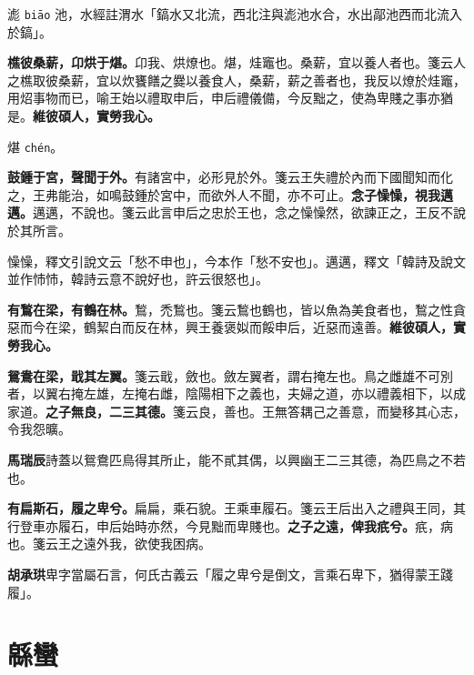 \begin{quoting}滮 \texttt{biāo} 池，水經註渭水「鎬水又北流，西北注與滮池水合，水出鄗池西而北流入於鎬」。\end{quoting}

\textbf{樵彼桑薪，卬烘于煁。}{\footnotesize 卬我、烘燎也。煁，烓竈也。桑薪，宜以養人者也。箋云人之樵取彼桑薪，宜以炊饔饍之爨以養食人，桑薪，薪之善者也，我反以燎於烓竈，用炤事物而已，喻王始以禮取申后，申后禮儀備，今反黜之，使為卑賤之事亦猶是。}\textbf{維彼碩人，實勞我心。}

\begin{quoting}煁 \texttt{chén}。\end{quoting}

\textbf{鼓鍾于宮，聲聞于外。}{\footnotesize 有諸宮中，必形見於外。箋云王失禮於內而下國聞知而化之，王弗能治，如鳴鼓鍾於宮中，而欲外人不聞，亦不可止。}\textbf{念子懆懆，視我邁邁。}{\footnotesize 邁邁，不說也。箋云此言申后之忠於王也，念之懆懆然，欲諫正之，王反不說於其所言。}

\begin{quoting}懆懆，釋文引說文云「愁不申也」，今本作「愁不安也」。邁邁，釋文「韓詩及說文並作㤄㤄，韓詩云意不說好也，許云很怒也」。\end{quoting}

\textbf{有鶖在梁，有鶴在林。}{\footnotesize 鶖，禿鶖也。箋云鶖也鶴也，皆以魚為美食者也，鶖之性貪惡而今在梁，鶴絜白而反在林，興王養褒姒而餒申后，近惡而遠善。}\textbf{維彼碩人，實勞我心。}

\textbf{鴛鴦在梁，戢其左翼。}{\footnotesize 箋云戢，斂也。斂左翼者，謂右掩左也。鳥之雌雄不可別者，以翼右掩左雄，左掩右雌，陰陽相下之義也，夫婦之道，亦以禮義相下，以成家道。}\textbf{之子無良，二三其德。}{\footnotesize 箋云良，善也。王無答耦己之善意，而變移其心志，令我怨曠。}

\begin{quoting}\textbf{馬瑞辰}詩蓋以鴛鴦匹鳥得其所止，能不貳其偶，以興幽王二三其德，為匹鳥之不若也。\end{quoting}

\textbf{有扁斯石，履之卑兮。}{\footnotesize 扁扁，乘石貌。王乘車履石。箋云王后出入之禮與王同，其行登車亦履石，申后始時亦然，今見黜而卑賤也。}\textbf{之子之遠，俾我疧兮。}{\footnotesize 疧，病也。箋云王之遠外我，欲使我困病。}

\begin{quoting}\textbf{胡承珙}卑字當屬石言，何氏古義云「履之卑兮是倒文，言乘石卑下，猶得蒙王踐履」。\end{quoting}

\section{緜蠻}

